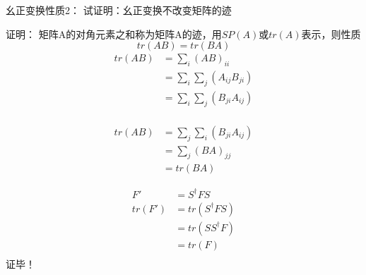 \begin{frame} 
    \begin{tcolorbox1}{幺正变换性质2：}
        试证明：幺正变换不改变矩阵的迹
    \end{tcolorbox1}
    \alert{证明：} 矩阵A的对角元素之和称为矩阵A的迹，用$SP(A)$或$tr(A)$表示，则性质\\
    $$tr(AB)=tr(BA) $$
    \begin{equation*}
        \begin{split}
            tr(AB) &=\sum_i (AB)_{ii}\\
            &=\sum_{i} \sum_{j} (A_{ij} B_{ji}) \\
            &=\sum_{i} \sum_{j} (B_{ji} A_{ij}) \\
        \end{split} 
    \end{equation*} 
\end{frame}    


\begin{frame}     
    \begin{equation*}
        \begin{split}
            tr(AB) &=\sum_{j} \sum_{i} (B_{ji} A_{ij}) \\
            &=\sum_{j} (BA)_{jj} \\
            &=tr(BA)
        \end{split} 
    \end{equation*}

    \begin{equation*}
        \begin{split}
            F'&= S^{\dagger} F S \\
            tr(F')&=tr(S^{\dagger} F S)\\
            &=tr(SS^{\dagger}  F)\\
            &=tr(F)\\
        \end{split} 
    \end{equation*} 
    证毕！
\end{frame}    

